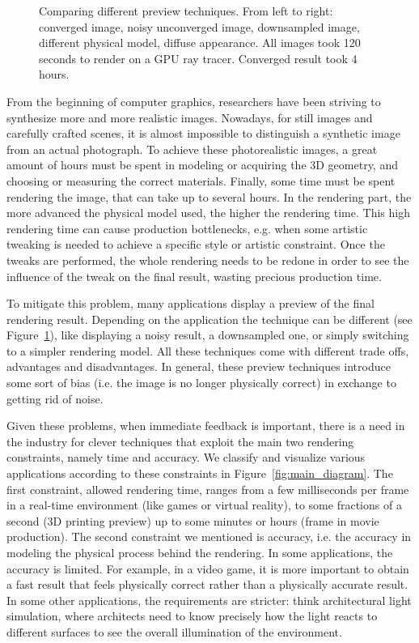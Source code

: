 \begin{figure}
\begin{tabular}{@{}c@{}c@{}c@{}c@{}c@{}}
\end{tabular}
\caption{Comparing different preview techniques. From left to right: converged image, noisy unconverged image, downsampled image, different physical model, diffuse appearance. All images took 120 seconds to render on a GPU ray tracer. Converged result took 4 hours.} 
\label{fig:comparison_convergence}
\end{figure}

From the beginning of computer graphics, researchers have been striving to synthesize more and more realistic images. Nowadays, for still images and carefully crafted scenes, it is almost impossible to distinguish a synthetic image from an actual photograph. To achieve these photorealistic images, a great amount of hours must be spent in modeling or acquiring the 3D geometry, and choosing or measuring the correct materials. Finally, some time must be spent rendering the image, that can take up to several hours. In the rendering part, the more advanced the physical model used, the higher the rendering time. This high rendering time can cause production bottlenecks, e.g. when some artistic tweaking is needed to achieve a specific style or artistic constraint. Once the tweaks are performed, the whole rendering needs to be redone in order to see the influence of the tweak on the final result, wasting precious production time. 

To mitigate this problem, many applications display a preview of the final rendering result. Depending on the application the technique can be different (see Figure~\ref{fig:comparison_convergence}), like displaying a noisy result, a downsampled one, or simply switching to a simpler rendering model. All these techniques come with different trade offs, advantages and disadvantages. In general, these preview techniques introduce some sort of bias (i.e. the image is no longer physically correct) in exchange to getting rid of noise. 

Given these problems, when immediate feedback is important, there is a need in the industry for clever techniques that exploit the main two rendering constraints, namely time and accuracy. We classify and visualize various applications according to these constraints in Figure~\ref{fig:main_diagram}. The first constraint, allowed rendering time, ranges from a few milliseconds per frame in a real-time environment (like games or virtual reality), to some fractions of a second (3D printing preview) up to some minutes or hours (frame in movie production). The second constraint we mentioned is accuracy, i.e. the accuracy in modeling the physical process behind the rendering. In some applications, the accuracy is  limited. For example, in a video game, it is more important to obtain a fast result that feels physically correct rather than a physically accurate result. In some other applications, the requirements are stricter: think architectural light simulation, where architects need to know precisely how the light reacts to different surfaces to see the overall illumination of the environment. 

